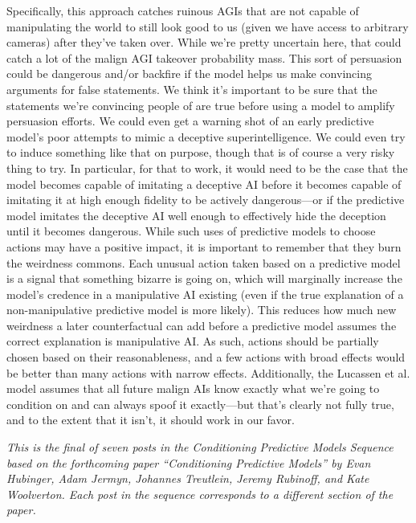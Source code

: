 {{     Specifically, this approach catches ruinous AGIs that are not capable of manipulating the world to still look good to us (given we have access to arbitrary cameras) after they've taken over. While we're pretty uncertain here, that could catch a lot of the malign AGI takeover probability mass.
     This sort of persuasion could be dangerous and/or backfire if the model helps us make convincing arguments for false statements. We think it's important to be sure that the statements we're convincing people of are true before using a model to amplify persuasion efforts.
     We could even get a warning shot\cite{TODO: cite https://www.lesswrong.com/posts/Km9sHjHTsBdbgwKyi/monitoring-for-deceptive-alignment} of an early predictive model's poor attempts to mimic a deceptive superintelligence. We could even try to induce something like that on purpose, though that is of course a very risky thing to try. In particular, for that to work, it would need to be the case that the model becomes capable of imitating a deceptive AI before it becomes capable of imitating it at high enough fidelity to be actively dangerous---or if the predictive model imitates the deceptive AI well enough to effectively hide the deception until it becomes dangerous.
     While such uses of predictive models to choose actions may have a positive impact, it is important to remember that they burn the weirdness commons. Each unusual action taken based on a predictive model is a signal that something bizarre is going on, which will marginally increase the model's credence in a manipulative AI existing (even if the true explanation of a non-manipulative predictive model is more likely). This reduces how much new weirdness a later counterfactual can add before a predictive model assumes the correct explanation is manipulative AI. As such, actions should be partially chosen based on their reasonableness, and a few actions with broad effects would be better than many actions with narrow effects.
     Additionally, the Lucassen et al. model assumes that all future malign AIs know exactly what we're going to condition on and can always spoof it exactly---but that's clearly not fully true, and to the extent that it isn't, it should work in our favor.


\textit{This is the final of seven posts in the Conditioning Predictive Models Sequence based on the forthcoming paper ``Conditioning Predictive Models'' by Evan Hubinger, Adam Jermyn, Johannes Treutlein, Jeremy Rubinoff, and Kate Woolverton. Each post in the sequence corresponds to a different section of the paper.}

}}
